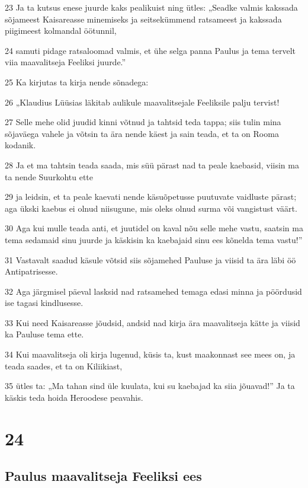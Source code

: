 \par 23 Ja ta kutsus enese juurde kaks pealikuist ning ütles: „Seadke valmis kakssada sõjameest Kaisareasse minemiseks ja seitsekümmend ratsameest ja kakssada piigimeest kolmandal öötunnil,
\par 24 samuti pidage ratsaloomad valmis, et ühe selga panna Paulus ja tema tervelt viia maavalitseja Feeliksi juurde.”
\par 25 Ka kirjutas ta kirja nende sõnadega:
\par 26 „Klaudius Lüüsias läkitab aulikule maavalitsejale Feeliksile palju tervist!
\par 27 Selle mehe olid juudid kinni võtnud ja tahtsid teda tappa; siis tulin mina sõjaväega vahele ja võtsin ta ära nende käest ja sain teada, et ta on Rooma kodanik.
\par 28 Ja et ma tahtsin teada saada, mis süü pärast nad ta peale kaebasid, viisin ma ta nende Suurkohtu ette
\par 29 ja leidsin, et ta peale kaevati nende käsuõpetusse puutuvate vaidluste pärast; aga ükski kaebus ei olnud niisugune, mis oleks olnud surma või vangistust väärt.
\par 30 Aga kui mulle teada anti, et juutidel on kaval nõu selle mehe vastu, saatsin ma tema sedamaid sinu juurde ja käskisin ka kaebajaid sinu ees kõnelda tema vastu!”
\par 31 Vastavalt saadud käsule võtsid siis sõjamehed Pauluse ja viisid ta ära läbi öö Antipatrisesse.
\par 32 Aga järgmisel päeval lasksid nad ratsamehed temaga edasi minna ja pöördusid ise tagasi kindlusesse.
\par 33 Kui need Kaisareasse jõudsid, andsid nad kirja ära maavalitseja kätte ja viisid ka Pauluse tema ette.
\par 34 Kui maavalitseja oli kirja lugenud, küsis ta, kust maakonnast see mees on, ja teada saades, et ta on Kiliikiast,
\par 35 ütles ta: „Ma tahan sind üle kuulata, kui su kaebajad ka siia jõuavad!” Ja ta käskis teda hoida Heroodese peavahis.


\chapter{24}

\section*{Paulus maavalitseja Feeliksi ees}


